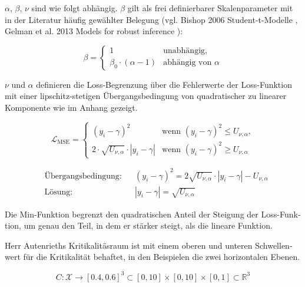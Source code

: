 \begin{otherlanguage}{ngerman}
$\alpha$, $\beta$, $\nu$ sind wie folgt abhängig. $\beta$ gilt als frei definierbarer Skalenparameter mit in der Literatur häufig gewählter Belegung (vgl. Bishop 2006 \glqq{}Student-t-Modelle\grqq{} \parencite{bishop2006pattern}, Gelman et al. 2013 \glqq{}Models for robust inference\grqq{} \parencite{gelman2013bayesian}): 

\[
\beta = \begin{cases}
1                                           & \text{unabhängig}, \\
\beta_{0} \cdot (\alpha - 1)                & \text{abhängig von } \alpha
\end{cases}
\]

$\nu$ und $\alpha$ definieren die Loss-Begrenzung über die Fehlerwerte der Loss-Funktion mit einer lipschitz-stetigen Übergangsbedingung von quadratischer zu linearer Komponente wie im Anhang gezeigt. 



\begin{equation}
\mathcal{L}_{\mathrm{MSE}} = 
\begin{cases}
  (y_i - \gamma)^2 & \text{wenn } (y_i - \gamma)^2 \le U_{\nu,\alpha}, \\
  2 \cdot \sqrt{U_{\nu, \alpha}} \cdot | y_i - \gamma | & \text{wenn } (y_i - \gamma)^2 \geq U_{\nu,\alpha}
\end{cases}
\end{equation}

\noindent
\begin{minipage}{\linewidth}
\begin{align*}
&\text{Übergangsbedingung:} && (y_i - \gamma)^2 = 2 \sqrt{U_{\nu,\alpha}} \cdot |y_i - \gamma| - U_{\nu,\alpha} \\
&\text{Lösung:} && |y_i - \gamma| = \sqrt{U_{\nu,\alpha}}
\end{align*}
\vspace{0.125\baselineskip}
\noindent
\end{minipage}

Die Min-Funktion begrenzt den quadratischen Anteil der Steigung der Loss-Funktion, um genau den Teil, in dem er stärker steigt, als die lineare Funktion. 

Herr Autenrieths Kritikalitäsraum ist mit einem oberen und unteren Schwellenwert für die Kritikalität behaftet, in den Beispielen die zwei horizontalen Ebenen.

\[
C \colon \mathcal{X} \rightarrow [0.4, 0.6]^3 \subset [0,10] \times [0,10] \times [0,1] \subset \mathbb{R}^3
\]


\end{otherlanguage}
